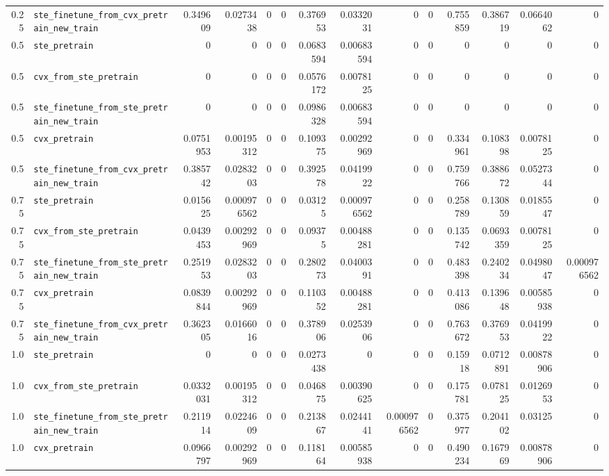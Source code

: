 \begin{longtable}{@{}r l *{12}{r}@{}}
0.25 & \texttt{ste\_finetune\_from\_cvx\_pretrain\_new\_train} & 0.349609 & 0.0273438 & 0 & 0 & 0.376953 & 0.0332031 & 0 & 0 & 0.755859 & 0.386719 & 0.0664062 & 0 \\
0.5 & \texttt{ste\_pretrain} & 0 & 0 & 0 & 0 & 0.0683594 & 0.00683594 & 0 & 0 & 0 & 0 & 0 & 0 \\
0.5 & \texttt{cvx\_from\_ste\_pretrain} & 0 & 0 & 0 & 0 & 0.0576172 & 0.0078125 & 0 & 0 & 0 & 0 & 0 & 0 \\
0.5 & \texttt{ste\_finetune\_from\_ste\_pretrain\_new\_train} & 0 & 0 & 0 & 0 & 0.0986328 & 0.00683594 & 0 & 0 & 0 & 0 & 0 & 0 \\
0.5 & \texttt{cvx\_pretrain} & 0.0751953 & 0.00195312 & 0 & 0 & 0.109375 & 0.00292969 & 0 & 0 & 0.334961 & 0.108398 & 0.0078125 & 0 \\
0.5 & \texttt{ste\_finetune\_from\_cvx\_pretrain\_new\_train} & 0.385742 & 0.0283203 & 0 & 0 & 0.392578 & 0.0419922 & 0 & 0 & 0.759766 & 0.388672 & 0.0527344 & 0 \\
0.75 & \texttt{ste\_pretrain} & 0.015625 & 0.000976562 & 0 & 0 & 0.03125 & 0.000976562 & 0 & 0 & 0.258789 & 0.130859 & 0.0185547 & 0 \\
0.75 & \texttt{cvx\_from\_ste\_pretrain} & 0.0439453 & 0.00292969 & 0 & 0 & 0.09375 & 0.00488281 & 0 & 0 & 0.135742 & 0.0693359 & 0.0078125 & 0 \\
0.75 & \texttt{ste\_finetune\_from\_ste\_pretrain\_new\_train} & 0.251953 & 0.0283203 & 0 & 0 & 0.280273 & 0.0400391 & 0 & 0 & 0.483398 & 0.240234 & 0.0498047 & 0.000976562 \\
0.75 & \texttt{cvx\_pretrain} & 0.0839844 & 0.00292969 & 0 & 0 & 0.110352 & 0.00488281 & 0 & 0 & 0.413086 & 0.139648 & 0.00585938 & 0 \\
0.75 & \texttt{ste\_finetune\_from\_cvx\_pretrain\_new\_train} & 0.362305 & 0.0166016 & 0 & 0 & 0.378906 & 0.0253906 & 0 & 0 & 0.763672 & 0.376953 & 0.0419922 & 0 \\
1.0 & \texttt{ste\_pretrain} & 0 & 0 & 0 & 0 & 0.0273438 & 0 & 0 & 0 & 0.15918 & 0.0712891 & 0.00878906 & 0 \\
1.0 & \texttt{cvx\_from\_ste\_pretrain} & 0.0332031 & 0.00195312 & 0 & 0 & 0.046875 & 0.00390625 & 0 & 0 & 0.175781 & 0.078125 & 0.0126953 & 0 \\
1.0 & \texttt{ste\_finetune\_from\_ste\_pretrain\_new\_train} & 0.211914 & 0.0224609 & 0 & 0 & 0.213867 & 0.0244141 & 0.000976562 & 0 & 0.375977 & 0.204102 & 0.03125 & 0 \\
1.0 & \texttt{cvx\_pretrain} & 0.0966797 & 0.00292969 & 0 & 0 & 0.118164 & 0.00585938 & 0 & 0 & 0.490234 & 0.167969 & 0.00878906 & 0 \\

\end{longtable}
